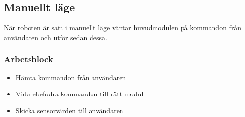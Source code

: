 \subsection{Manuellt läge}
När roboten är satt i manuellt läge väntar huvudmodulen på kommandon från användaren och utför sedan dessa. 
\subsubsection{Arbetsblock}
\begin{itemize}
\item Hämta kommandon från användaren
\item Vidarebefodra kommandon till rätt modul
\item Skicka sensorvärden till användaren
\end{itemize}